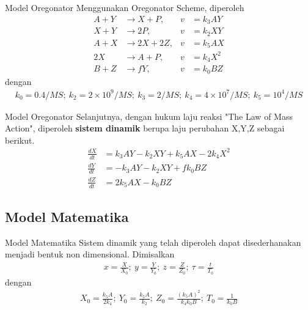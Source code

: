 \documentclass[aspectratio=169]{beamer}
\begin{document}
\begin{frame}{Model Oregonator}
    Menggunakan Oregonator Scheme, diperoleh
    \begin{align*}
        A+Y &\to X + P, & v &= k_3 AY\\
        X + Y &\to 2P, & v &= k_2 XY\\
        A + X &\to 2X + 2Z, & v &= k_5 AX\\
        2X &\to A + P, & v &= k_4 X^2\\
        B + Z &\to fY, & v &= k_0 BZ
    \end{align*}
    dengan
    \begin{align*}
        k_0 = 0.4/MS; \ k_2 = 2 \times 10^9/MS; \ k_3 = 2/MS; \ k_4 = 4 \times 10^7/MS; \ k_5 = 10^4/MS
    \end{align*}
\end{frame}

\begin{frame}{Model Oregonator}
    Selanjutnya, dengan hukum laju reaksi "The Law of Mass Action", diperoleh \textbf{sistem dinamik} berupa laju perubahan X,Y,Z sebagai berikut.
    \begin{align*}
        \frac{dX}{dt} &= k_3 AY - k_2 XY + k_5 AX - 2k_4 X^2\\
        \frac{dY}{dt} &= -k_3 AY - k_2 XY + fk_0 BZ\\
        \frac{dZ}{dt} &= 2k_5 AX - k_0 BZ
    \end{align*}
\end{frame}

\subsection{Model Matematika}

\begin{frame}{Model Matematika}
    Sistem dinamik yang telah diperoleh dapat disederhanakan menjadi bentuk non dimensional. Dimisalkan
    \begin{align*}
        x = \frac{X}{X_0}; \ y = \frac{Y}{Y_0}; \ z= \frac{Z}{Z_0}; \ \tau = \frac{t}{T_0}
    \end{align*}
    dengan
    \begin{align*}
        X_0 = \frac{k_5 A}{2k_4}; \ Y_0 = \frac{k_5 A}{k_2}; \ Z_0 = \frac{(k_5 A)^2}{k_4 k_0 B}; \ T_0 = \frac{1}{k_0 B}
    \end{align*}
\end{frame}
\end{document}
